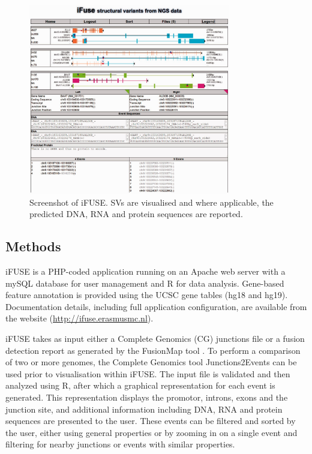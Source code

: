 \begin{figure}
\centerline{\includegraphics[width=250pt]{chapters/images/iFUSE/ifusess.jpeg}}
\caption{Screenshot of iFUSE. SVs are visualised and where applicable, the predicted DNA, RNA and protein sequences are reported.}
\label{fig:screenshot}
\end{figure}


\subsection*{Methods}

iFUSE is a PHP-coded application running on an Apache web server with a mySQL database for user management and R for data analysis. Gene-based feature annotation is provided using the UCSC gene tables (hg18 and hg19). Documentation details, including full application configuration, are available from the website (\href{http://ifuse.erasmusmc.nl}{http://ifuse.erasmusmc.nl}).

iFUSE takes as input either a Complete Genomics (CG) junctions file or a fusion detection report as generated by the FusionMap tool \cite{fusionmap}.  To perform a comparison of two or more genomes, the Complete Genomics tool Junctions2Events can be used prior to visualisation within iFUSE.\color{black}
The input file is validated and then analyzed using R, after which a graphical representation for each event is generated. This representation displays the promotor, introns, exons and the junction site, and additional information including DNA, RNA and protein sequences are presented to the user. These events can be filtered and sorted by the user, either using general properties or by zooming in on a single event and filtering for nearby junctions or events with similar properties.

